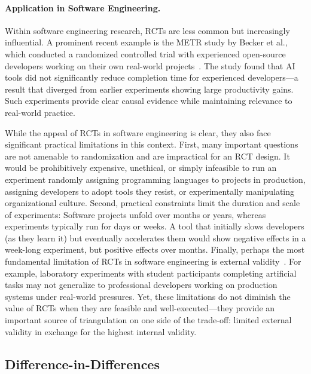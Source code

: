 \paragraph{Application in Software Engineering.}
Within software engineering research, RCTs are less common but increasingly influential.
A prominent recent example is the METR study by Becker et al., which conducted a randomized controlled trial with experienced open-source developers working on their own real-world projects~\cite{DBLP:journals/corr/abs-2507-09089}.
The study found that AI tools did not significantly reduce completion time for experienced developers---a result that diverged from earlier experiments showing large productivity gains.
Such experiments provide clear causal evidence while maintaining relevance to real-world practice.

While the appeal of RCTs in software engineering is clear, they also face significant practical limitations in this context.
First, many important questions are not amenable to randomization and are impractical for an RCT design.
It would be prohibitively expensive, unethical, or simply infeasible to run an experiment randomly assigning programming languages to projects in production, assigning developers to adopt tools they resist, or experimentally manipulating organizational culture.
Second, practical constraints limit the duration and scale of experiments: Software projects unfold over months or years, whereas experiments typically run for days or weeks. 
A tool that initially slows developers (as they learn it) but eventually accelerates them would show negative effects in a week-long experiment, but positive effects over months.
Finally, perhaps the most fundamental limitation of RCTs in software engineering is external validity~\cite{DBLP:journals/ese/KalliamvakouGBS16}.
For example, laboratory experiments with student participants completing artificial tasks may not generalize to professional developers working on production systems under real-world pressures.
Yet, these limitations do not diminish the value of RCTs when they are feasible and well-executed---they provide an important source of triangulation on one side of the trade-off: limited external validity in exchange for the highest internal validity.

\subsection{Difference-in-Differences}
\label{sec:chap2-did}

